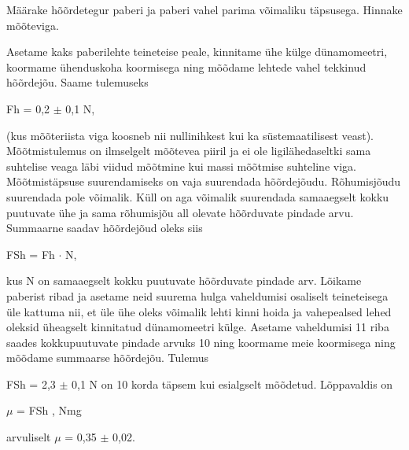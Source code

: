 
Määrake hõõrdetegur paberi ja paberi vahel parima võimaliku täpsusega. Hinnake mõõteviga.

\hint

\solu
Asetame kaks paberilehte teineteise peale, kinnitame ühe külge dünamomeetri, koormame ühenduskoha koormisega ning mõõdame lehtede vahel tekkinud hõõrdejõu. Saame tulemuseks

Fh = 0,2 $\pm$ 0,1 N,

(kus mõõteriista viga koosneb nii nullinihkest kui ka süstemaatilisest veast). Mõõtmistulemus on ilmselgelt mõõtevea piiril ja ei ole ligilähedaseltki sama suhtelise veaga läbi viidud mõõtmine kui massi mõõtmise suhteline viga. Mõõtmistäpsuse suurendamiseks on vaja suurendada hõõrdejõudu. Rõhumisjõudu suurendada pole võimalik. Küll on aga võimalik suurendada samaaegselt kokku puutuvate ühe ja sama rõhumisjõu all olevate hõõrduvate pindade arvu. Summaarne saadav hõõrdejõud oleks siis

FSh = Fh $\cdot$ N,

kus N on samaaegselt kokku puutuvate hõõrduvate pindade arv. Lõikame paberist ribad ja asetame neid suurema hulga vaheldumisi osaliselt teineteisega üle kattuma nii, et üle ühe oleks võimalik lehti kinni hoida ja vahepealsed lehed oleksid üheagselt kinnitatud dünamomeetri külge. Asetame vaheldumisi 11 riba saades kokkupuutuvate pindade arvuks 10 ning koormame meie koormisega ning mõõdame summaarse hõõrdejõu. Tulemus

FSh = 2,3 $\pm$ 0,1 N on 10 korda täpsem kui esialgselt mõõdetud. Lõppavaldis on

$\mu$ = FSh , Nmg

arvuliselt $\mu$ = 0,35 $\pm$ 0,02.
\probend
